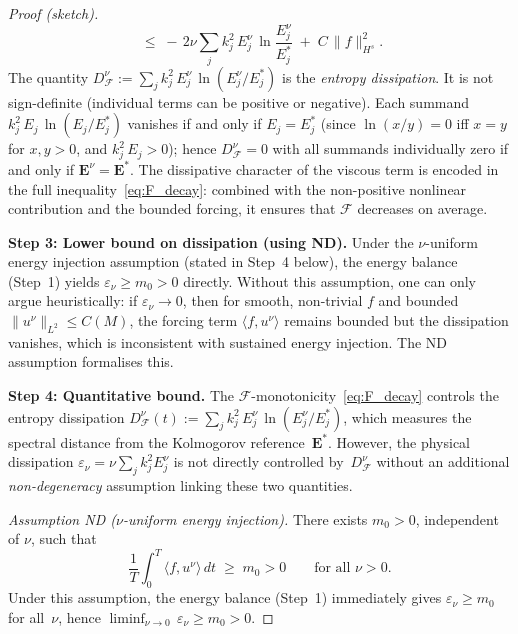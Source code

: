 \documentclass[12pt,a4paper]{article}
\theoremstyle{definition}
\theoremstyle{plain}
\theoremstyle{remark}
\begin{document}
\begin{proof}[Proof (sketch)]
\begin{equation}
  \;\le\;
  -\,2\nu \sum_{j} k_j^2\,
    E_j^\nu\,\ln\!\frac{E_j^\nu}{E_j^*}
  \;+\;
  C\,\|f\|_{H^s}^2.
\end{equation}
The quantity $D_\mathcal{F}^\nu := \sum_j k_j^2\,
E_j^\nu\,\ln(E_j^\nu/E_j^*)$ is the \emph{entropy dissipation}.
It is not sign-definite (individual terms can be positive or negative).
Each summand $k_j^2\,E_j\,\ln(E_j/E_j^*)$ vanishes if and only if
$E_j = E_j^*$ (since $\ln(x/y) = 0$ iff $x = y$ for $x,y > 0$,
and $k_j^2\,E_j > 0$); hence $D_\mathcal{F}^\nu = 0$ with all
summands individually zero if and only if $\mathbf{E}^\nu = \mathbf{E}^*$.
The dissipative character of the viscous term is encoded in the
full inequality~\eqref{eq:F_decay}: combined with the non-positive
nonlinear contribution and the bounded forcing, it ensures that
$\mathcal{F}$ decreases on average.

\textbf{Step 3: Lower bound on dissipation (using ND).}\;
Under the $\nu$-uniform energy injection assumption (stated in Step~4
below), the energy balance (Step~1) yields $\varepsilon_\nu \ge m_0 > 0$
directly. Without this assumption, one can only argue heuristically:
if $\varepsilon_\nu \to 0$, then for smooth, non-trivial $f$ and bounded
$\|u^\nu\|_{L^2} \le C(M)$, the forcing term $\langle f, u^\nu \rangle$
remains bounded but the dissipation vanishes, which is inconsistent
with sustained energy injection. The ND assumption formalises this.

\textbf{Step 4: Quantitative bound.}\;
The $\mathcal{F}$-monotonicity~\eqref{eq:F_decay} controls the
entropy dissipation $D_\mathcal{F}^\nu(t) := \sum_j k_j^2\,
E_j^\nu\,\ln(E_j^\nu/E_j^*)$, which measures the spectral distance
from the Kolmogorov reference~$\mathbf{E}^*$.
However, the physical dissipation $\varepsilon_\nu = \nu\sum_j k_j^2 E_j^\nu$
is not directly controlled by~$D_\mathcal{F}^\nu$ without an additional
\emph{non-degeneracy} assumption linking these two quantities.

\emph{Assumption ND ($\nu$-uniform energy injection).}\;
There exists $m_0 > 0$, independent of $\nu$, such that
\begin{equation}\label{eq:ND}
  \frac{1}{T}\int_0^T \langle f, u^\nu \rangle\,dt \;\ge\; m_0 > 0
  \qquad \text{for all } \nu > 0.
\end{equation}
Under this assumption, the energy balance (Step~1) immediately gives
$\varepsilon_\nu \ge m_0$ for all~$\nu$, hence
$\liminf_{\nu\to 0}\,\varepsilon_\nu \ge m_0 > 0$.


\end{proof}
\end{document}
